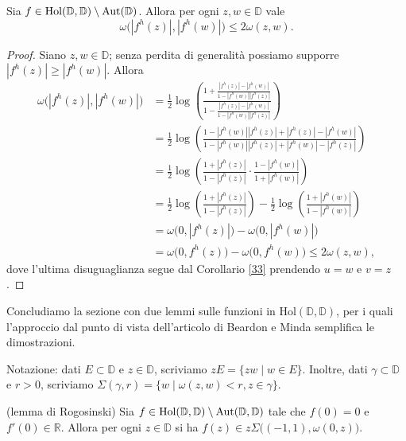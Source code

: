 
\begin{cor} \label{quasigolusin}
  Sia $f \in \text{\normalfont{Hol}}(\mathbb{D},\mathbb{D})\setminus\text{\normalfont{Aut}}(\mathbb{D})$. Allora per ogni $z, w \in \mathbb{D}$ vale
  \begin{equation} \label{quasigol}
    \omega\bigl(|f^h(z)|, |f^h(w)|\bigr) \le 2\omega(z,w).
  \end{equation}
\end{cor}

\begin{proof}
  Siano $z, w \in \mathbb{D}$; senza perdita di generalità possiamo supporre $|f^h(z)| \ge |f^h(w)|$. Allora
  \begin{align*}
    \omega\bigl(|f^h(z)|, |f^h(w)|\bigr) & =\frac{1}{2}\log\left(\frac{1+\frac{|f^h(z)|-|f^h(w)|}{1-|f^h(w)||f^h(z)|}}{1-\frac{|f^h(z)|-|f^h(w)|}{1-|f^h(w)||f^h(z)|}}\right) \\
    & =\frac{1}{2}\log\left(\frac{1-|f^h(w)||f^h(z)|+|f^h(z)|-|f^h(w)|}{1-|f^h(w)||f^h(z)|+|f^h(w)|-|f^h(z)|}\right) \\
    & =\frac{1}{2}\log\left(\frac{1+|f^h(z)|}{1-|f^h(z)|}\cdot\frac{1-|f^h(w)|}{1+|f^h(w)|}\right) \\
    & =\frac{1}{2}\log\left(\frac{1+|f^h(z)|}{1-|f^h(z)|}\right)-\frac{1}{2}\log\left(\frac{1+|f^h(w)|}{1-|f^h(w)|}\right) \\
    & =\omega\bigl(0,|f^h(z)|\bigr)-\omega\bigl(0,|f^h(w)|\bigr) \\
    & =\omega\bigl(0,f^h(z)\bigr)-\omega\bigl(0,f^h(w)\bigr) \le 2\omega(z,w),
  \end{align*}
  dove l'ultima disuguaglianza segue dal Corollario \ref{33} prendendo $u=w$ e $v=z$.
\end{proof}

Concludiamo la sezione con due lemmi sulle funzioni in $\text{Hol}(\mathbb{D},\mathbb{D})$, per i quali l'approccio dal punto di vista dell'articolo di Beardon e Minda semplifica le dimostrazioni.


Notazione: dati $E \subset \mathbb{D}$ e $z \in \mathbb{D}$, scriviamo $zE=\{zw \mid w \in E\}$. Inoltre, dati $\gamma \subset \mathbb{D}$ e $r>0$, scriviamo $\Sigma(\gamma,r)=\{w \mid \omega(z,w)<r, z \in \gamma\}$.

\begin{lm}
  (lemma di Rogosinski) Sia $f \in \normalfont{\text{Hol}}(\mathbb{D},\mathbb{D})\setminus\normalfont{\text{Aut}}(\mathbb{D},\mathbb{D})$ tale che $f(0)=0$ e $f'(0) \in \mathbb{R}$. Allora per ogni $z \in \mathbb{D}$ si ha $f(z) \in z\Sigma\bigl((-1,1),\omega(0,z)\bigr)$.
\end{lm}

